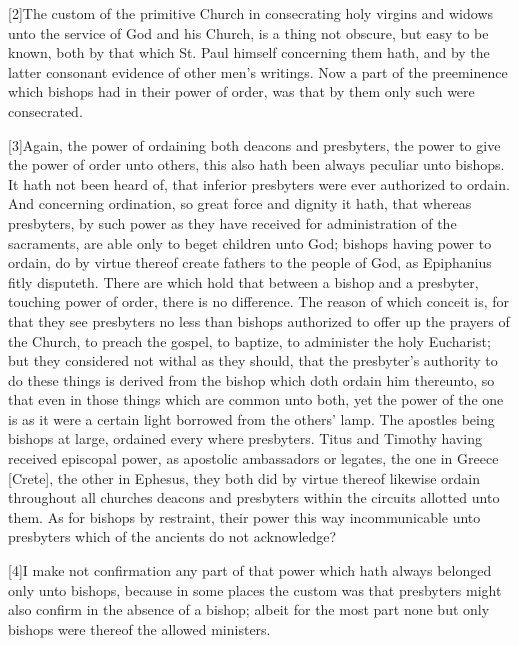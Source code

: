 [2]The custom of the primitive Church in consecrating holy virgins and widows unto the service of God and his Church, is a thing not obscure, but easy to be known, both  by that which St. Paul himself concerning them hath,
 and by the latter consonant evidence of other men’s writings. Now a part of the preeminence which bishops had in their power of order, was that by them only such were consecrated.

[3]Again, the power of ordaining both deacons and presbyters, the power to give the power of order unto others, this also hath been always peculiar unto bishops. It hath not been heard of, that inferior presbyters were ever authorized to ordain. And concerning ordination, so great force and dignity it hath, that whereas presbyters, by such power as they have received for administration of the sacraments, are able only to beget children unto God; bishops having power to ordain, do by virtue thereof create fathers to the people of God, as Epiphanius fitly disputeth. There are which hold that between a bishop and a presbyter, touching power of order, there is no difference. The reason of which conceit is, for that they see presbyters no less than bishops authorized to offer up the prayers of the Church, to preach the gospel, to baptize, to administer the holy Eucharist; but they considered not withal as they should, that the presbyter’s authority to do these things is derived from the bishop which doth ordain him thereunto, so that even in those things which are common unto both, yet the power of the one is as it were a certain light borrowed from the others’ lamp. The apostles being bishops at large, ordained every where presbyters. Titus and Timothy having received episcopal power, as apostolic ambassadors or legates, the one in Greece [Crete], the other in Ephesus, they both did by virtue thereof likewise ordain throughout all churches deacons and presbyters within the circuits allotted unto them. As for bishops by restraint, their power this way incommunicable unto presbyters which of the ancients do not acknowledge?


[4]I make not confirmation any part of that power which hath always belonged only unto bishops, because in some places the custom was that presbyters might also confirm in the absence of a bishop; albeit for the most part none but only bishops were thereof the allowed ministers.

